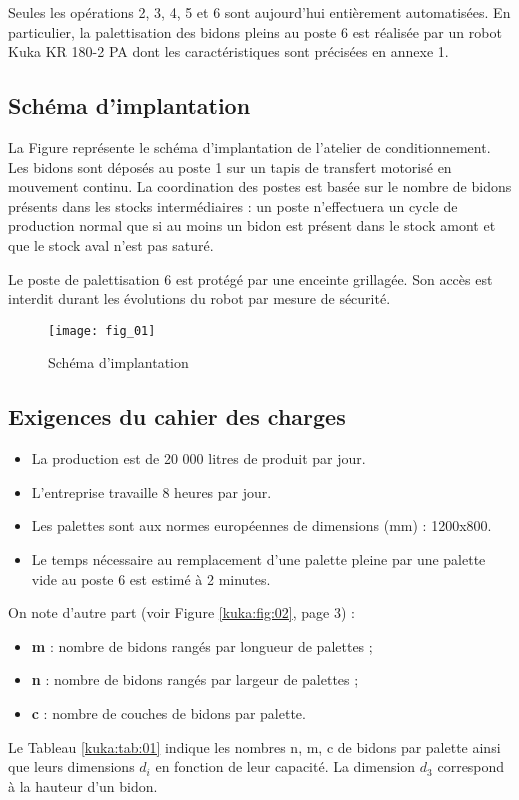 \vspace{.4cm}

Seules les opérations 2, 3, 4, 5 et 6 sont aujourd’hui entièrement automatisées. En particulier, 
la palettisation des bidons pleins au poste 6 est réalisée par un robot Kuka KR 180-2 PA dont 
les caractéristiques sont précisées en annexe 1.
\fi
\subsection{Schéma d’implantation}

\ifprof
\else
La Figure \label{kuka:kuka:fig:01} représente le schéma d’implantation de l’atelier de conditionnement. Les 
bidons sont déposés au poste 1 sur un tapis de transfert motorisé en mouvement continu. La 
coordination des postes est basée sur le nombre de bidons présents dans les stocks 
intermédiaires : un poste n’effectuera un cycle de production normal que si au moins un bidon 
est présent dans le stock amont et que le stock aval n’est pas saturé.

Le poste de palettisation 6 est protégé par une enceinte grillagée. Son accès est interdit durant 
les évolutions du robot par mesure de sécurité. 


\begin{figure}[H]
\centering
\texttt{[image: fig\_01]}
\caption{Schéma d'implantation \label{kuka:fig:01}}
\end{figure}
\fi

\subsection{Exigences du cahier des charges}
\ifprof
\else

\begin{itemize}
\item La production est de 20 000 litres de produit par jour. 
\item L’entreprise travaille 8 heures par jour. 
\item Les palettes sont aux normes européennes de dimensions (mm) : 1200x800. 
\item Le temps nécessaire au remplacement d’une palette pleine par une palette vide au 
poste 6 est estimé à 2 minutes. 
\end{itemize}
On note d’autre part (voir Figure \ref{kuka:fig:02}, page 3) :
\begin{itemize}
\item \textbf{m} : nombre de bidons rangés par longueur de palettes ; 
\item \textbf{n} : nombre de bidons rangés par largeur de palettes ; 
\item \textbf{c} : nombre de couches de bidons par palette. 
\end{itemize}
Le Tableau \ref{kuka:tab:01} indique les nombres n, m, c de bidons par palette ainsi que leurs 
dimensions $d_i$ en fonction de leur capacité. La dimension $d_3$ correspond à la hauteur d’un 
bidon. 



